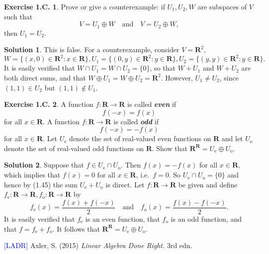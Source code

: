 \documentclass[12pt]{article}
\theoremstyle{definition}
\theoremstyle{exercise}
\newtheorem{exercise}{Exercise 1.C.}
\theoremstyle{solution}
\newtheorem*{solution}{Solution}
\newcommand{\R}{\mathbf{R}}
\begin{document}
\begin{exercise}
\label{ex:23}
    Prove or give a counterexample: if \( U_1, U_2, W \) are subspaces of \( V \) such that
    \[
        V = U_1 \oplus W \quad \text{and} \quad V = U_2 \oplus W,
    \]
    then \( U_1 = U_2 \).
\end{exercise}

\begin{solution}
    This is false. For a counterexample, consider \( V = \R^2 \),
    \[
        W = \{ (x, 0) \in \R^2 : x \in \R \}, U_1 = \{ (0, y) \in \R^2 : y \in \R \}, U_2 = \{ (y, y) \in \R^2 : y \in \R \}.
    \]
    It is easily verified that \( W \cap U_1 = W \cap U_2 = \{ 0 \} \), so that \( W + U_1 \) and \( W + U_2 \) are both direct sums, and that \( W \oplus U_1 = W \oplus U_2 = \R^2 \). However, \( U_1 \neq U_2 \), since \( (1, 1) \in U_2 \) but \( (1, 1) \not\in U_1 \).
\end{solution}

\begin{exercise}
\label{ex:24}
    A function \( f : \R \to \R \) is called \textit{\textbf{even}} if
    \[
        f(-x) = f(x)
    \]
    for all \( x \in \R \). A function \( f : \R \to \R \) is called \textit{\textbf{odd}} if
    \[
        f(-x) = -f(x)
    \]
    for all \( x \in \R \). Let \( U_{\text{e}} \) denote the set of real-valued even functions on \( \R \) and let \( U_{\text{o}} \) denote the set of real-valued odd functions on \( \R \). Show that \( \R^{\R} = U_{\text{e}} \oplus U_{\text{o}} \). 
\end{exercise}

\begin{solution}
    Suppose that \( f \in U_{\text{e}} \cap U_{\text{o}} \). Then \( f(x) = -f(x) \) for all \( x \in \R \), which implies that \( f(x) = 0 \) for all \( x \in \R \), i.e.\ \( f = 0 \). So \( U_{\text{e}} \cap U_{\text{o}} = \{ 0 \} \) and hence by (1.45) the sum \( U_{\text{e}} + U_{\text{o}} \) is direct. Let \( f : \R \to \R \) be given and define \( f_{\text{e}} : \R \to \R, f_{\text{o}} : \R \to \R \) by
    \[
        f_{\text{e}} (x) = \frac{f(x) + f(-x)}{2} \quad \text{and} \quad f_{\text{o}} (x) = \frac{f(x) - f(-x)}{2}.
    \]
    It is easily verified that \( f_{\text{e}} \) is an even function, that \( f_{\text{o}} \) is an odd function, and that \( f = f_{\text{e}} + f_{\text{o}} \). It follows that \( \R^{\R} = U_{\text{e}} \oplus U_{\text{o}} \).
\end{solution}

\noindent \hrulefill

\noindent \hypertarget{ladr}{\textcolor{blue}{[LADR]} Axler, S. (2015) \textit{Linear Algebra Done Right.} 3rd edn.}
\end{document}
